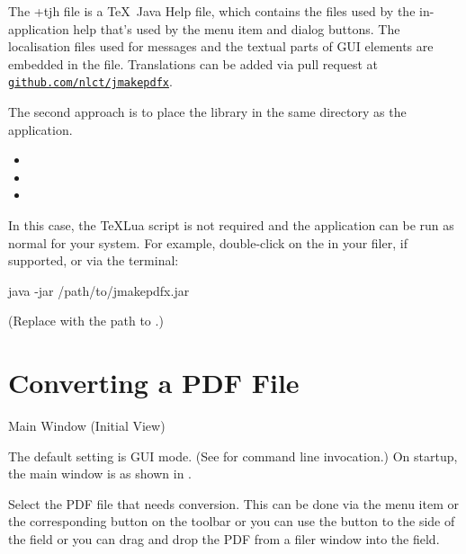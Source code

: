 \begin{information}
The \ext+{tjh} file is a \TeX\ Java Help file, which contains the
files used by the in-application help that's used by the
 menu item and dialog  buttons.
The localisation files used for messages and the textual parts of
\gls{GUI} elements are embedded in the  file.
Translations can be added via pull request at
\href{https://github.com/nlct/jmakepdfx}{\nolinkurl{github.com/nlct/jmakepdfx}}.
\end{information}

The second approach is to place the 
library in the same directory as the 
application.
\begin{itemize}
\item {}
\item {}
\item {}
\end{itemize}
In this case, the \TeX Lua script is not required and the
 application can be run as normal for your
system. For example, double-click on the 
in your filer, if supported, or via the terminal:
\begin{terminal}
java -jar /path/to/jmakepdfx.jar
\end{terminal}
(Replace  with the path to
.)

\chapter{Converting a PDF File}
\label{sec:conversion}

 {%
 }
 {Main Window (Initial View)}

The default setting is \gls{GUI} mode. (See 
for command line invocation.) On startup, the main window is as
shown in .

Select the PDF file that needs conversion. This can be done via the 
 menu item or the corresponding button on the
toolbar or you can use the  button to the
side of the  field or you can drag and drop the
PDF from a filer window into the  field.

